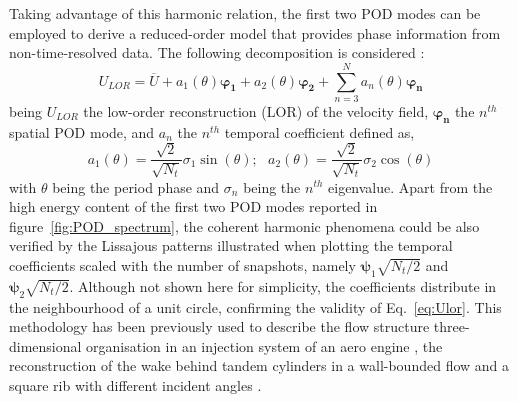 Taking advantage of this harmonic relation, the first two POD modes can be employed to derive a reduced-order model that provides phase information from non-time-resolved data. The following decomposition is considered \citep{ben2004reconstruction}:
%
\begin{equation}\label{eq:Ulor}
    U_{LOR} = \overline{U} + a_1(\theta)\boldsymbol{\varphi_1} + a_2(\theta)\boldsymbol{\varphi_2} + \sum_{n=3}^{N} a_n(\theta)\boldsymbol{\varphi_n}
\end{equation}
%
being $U_{LOR}$ the low-order reconstruction (LOR) of the velocity field, $\boldsymbol{\varphi_n}$ the $n^{th}$ spatial POD mode, and $a_n$ the $n^{th}$ temporal coefficient defined as,
%
\begin{equation}\label{eq:temp_modes}
    a_1(\theta) = \frac{\sqrt{2}}{\sqrt{N_t}}\sigma_1\sin{(\theta)}; ~~~ a_2(\theta) = \frac{\sqrt{2}}{\sqrt{N_t}}\sigma_2\cos{(\theta)}
\end{equation}
%
with $\theta$ being the period phase and $\sigma_n$ being the $n^{th}$ eigenvalue. Apart from the high energy content of the first two POD modes reported in figure~\ref{fig:POD_spectrum}, the coherent harmonic phenomena could be also verified by the Lissajous patterns illustrated when plotting the temporal coefficients scaled with the number of snapshots, namely $\boldsymbol{\psi}_1\sqrt{N_t/2}$ and $\boldsymbol{\psi}_2\sqrt{N_t/2}$. Although not shown here for simplicity, the coefficients distribute in the neighbourhood of a unit circle, confirming the validity of Eq.~\eqref{eq:Ulor}. This methodology has been previously used to describe the flow structure three-dimensional organisation in an injection system of an aero engine \citep{Ceglia2014}, the reconstruction of the wake behind tandem cylinders in a wall-bounded flow and a square rib with different incident angles \citep{Oudheusden2005phaseres}.

